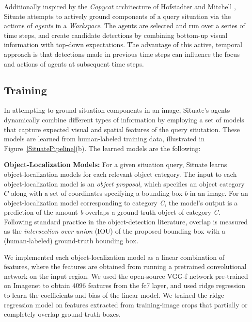 \documentclass[conference]{IEEEtran}
\begin{document}
Additionally inspired by the {\it Copycat} architecture of Hofstadter
and Mitchell \cite{Hofstadter1994}, Situate attempts to actively
ground components of a query situation via the actions of
{\it agents} in a {\it Workspace}.  The agents are selected and run
over a series of time steps, and create candidate detections by
combining bottom-up visual information with top-down expectations.
The advantage of this active, temporal approach is that detections
made in previous time steps can influence the focus and actions of
agents at subsequent time steps.  

\subsection{Training \label{training}}

In attempting to ground situation components in an image, Situate's
agents dynamically combine different types of information by employing
a set of models that capture expected visual and spatial features of
the query situtation.  These models are learned from human-labeled
training data, illustrated in Figure~\ref{SituatePipeline}(b).  
The learned models are the following:


{\bf Object-Localization Models:} For a given situation query, Situate
learns object-localization models for each relevant object category.  The
input to each object-localization model is an {\it object proposal}, which
specifies an object category $C$ along with a set of coordinates
specifying a bounding box $b$ in an image.  For an object-localization
model corresponding to category {\it C}, the model's output is a
prediction of the amount {\it b} overlaps a ground-truth
object of category {\it C}.  Following standard practice in the
object-detection literature, overlap is measured as the {\it
  intersection over union} (IOU) of the proposed bounding box with a
(human-labeled) ground-truth bounding box.

We implemented each object-localization model as a linear combination of
features, where the features are obtained from running a pretrained
convolutional network on the input region.  We used the open-source
VGG-f network pre-trained on Imagenet \cite{Imagenet-vgg} to obtain
4096 features from the fc7 layer, and used ridge regression
\cite{MatlabRidgeRegression} to learn the coefficients and bias of the
linear model.  We trained the ridge regression model on
features extracted from training-image crops that partially or
completely overlap ground-truth boxes.
\end{document}

